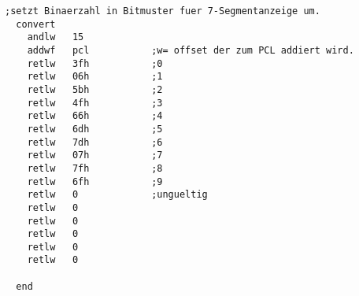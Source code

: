 \begin{lstlisting}[language=avr]
 ;setzt Binaerzahl in Bitmuster fuer 7-Segmentanzeige um.
  convert
    andlw   15
    addwf   pcl           ;w= offset der zum PCL addiert wird.
    retlw   3fh           ;0
    retlw   06h           ;1
    retlw   5bh           ;2
    retlw   4fh           ;3
    retlw   66h           ;4
    retlw   6dh           ;5
    retlw   7dh           ;6
    retlw   07h           ;7
    retlw   7fh           ;8
    retlw   6fh           ;9
    retlw   0             ;ungueltig
    retlw   0
    retlw   0
    retlw   0
    retlw   0
    retlw   0
  
  end

\end{lstlisting}